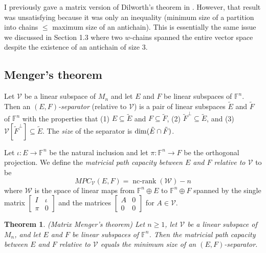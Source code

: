 \documentclass{amsart}
\newtheorem{thm}{Theorem}[section]
\theoremstyle{definition}
\newcommand\ncrank{\operatorname{nc-rank}}
\begin{document}
I previously gave a matrix version of Dilworth's theorem in \cite[Theorem 6.8]{weaver}. However, that result was unsatisfying because it was only an inequality (minimum size of a partition into chains $\leq$ maximum size of an antichain). This is essentially the same issue we discussed in Section 1.3 where two $w$-chains spanned the entire vector space despite the existence of an antichain of size 3.

\subsection{Menger's theorem}

Let $\mathcal{V}$ be a linear subspace of $M_n$ and let $E$ and $F$ be linear subspaces of $\mathbb{F}^n$. Then an {\it $(E,F)$-separator} (relative to $\mathcal{V}$) is a pair of linear subspaces $\tilde{E}$ and $\tilde{F}$ of $\mathbb{F}^n$ with the properties that (1) $E \subseteq \tilde{E}$ and $F \subseteq \tilde{F}$, (2) $\tilde{F}^\perp \subseteq \tilde{E}$, and (3) $\mathcal{V}[\tilde{F}^\perp] \subseteq  \tilde{E}$. The {\it size} of the separator is ${\rm dim}(\tilde{E} \cap \tilde{F})$.

Let $\iota: E \to \mathbb{F}^n$ be the natural inclusion and let $\pi: \mathbb{F}^n \to F$ be the orthogonal projection. We define the {\it matricial path capacity between $E$ and $F$ relative to $\mathcal{V}$} to be $$MPC_{\mathcal{V}}(E,F) = \ncrank(\mathcal{W}) - n$$ where $\mathcal{W}$ is the space of linear maps from $\mathbb{F}^n \oplus E$ to $\mathbb{F}^n \oplus F$ spanned by the single matrix $\left[\begin{matrix}I&\iota\\ \pi&0\end{matrix}\right]$ and the matrices $\left[\begin{matrix}A&0\\0&0\end{matrix}\right]$ for $A \in \mathcal{V}$.

\begin{thm}\label{mmt} (Matrix Menger's theorem)
Let $n \geq 1$, let $\mathcal{V}$ be a linear subspace of $M_n$, and let $E$ and $F$ be linear subspaces of $\mathbb{F}^n$. Then the matricial path capacity between $E$ and $F$ relative to $\mathcal{V}$ equals the minimum size of an $(E,F)$-separator.
\end{thm}
\end{document}
